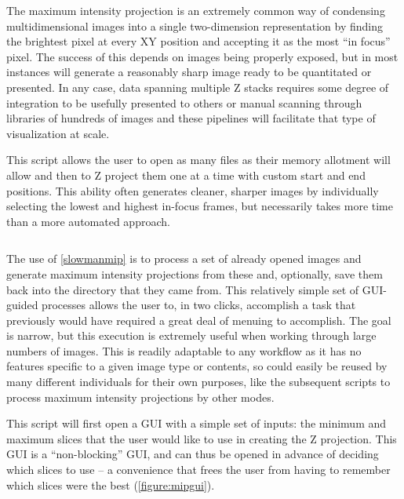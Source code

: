 The maximum intensity projection is an extremely common way of condensing multidimensional images into a single two\hyp{}dimension representation by finding the brightest pixel at every XY position and accepting it as the most ``in focus'' pixel. The success of this depends on images being properly exposed, but in most instances will generate a reasonably sharp image ready to be quantitated or presented. In any case, data spanning multiple Z stacks requires some degree of integration to be usefully presented to others or manual scanning through libraries of hundreds of images and these pipelines will facilitate that type of visualization at scale.

\begin{code}
\caption{This script allows the user to open as many files as their memory allotment will allow and then to Z project them one at a time with custom start and end positions. This ability often generates cleaner, sharper images by individually selecting the lowest and highest in\hyp{}focus frames, but necessarily takes more time than a more automated approach.}
\label{slowmanmip}

\inputminted[breaklines,frame=single,fontsize=\small]{python}{source/manMIPper.py}

\end{code}

The use of \autoref{slowmanmip} is to process a set of already opened images and generate maximum intensity projections from these and, optionally, save them back into the directory that they came from. This relatively simple set of GUI\hyp{}guided processes allows the user to, in two clicks, accomplish a task that previously would have required a great deal of menuing to accomplish. The goal is narrow, but this execution is extremely useful when working through large numbers of images. This is readily adaptable to any workflow as it has no features specific to a given image type or contents, so could easily be reused by many different individuals for their own purposes, like the subsequent scripts to process maximum intensity projections by other modes.

This script will first open a GUI with a simple set of inputs: the minimum and maximum slices that the user would like to use in creating the Z projection. This GUI is a ``non\hyp{}blocking'' GUI, and can thus be opened in advance of deciding which slices to use -- a convenience that frees the user from having to remember which slices were the best (\autoref{figure:mipgui}). 

